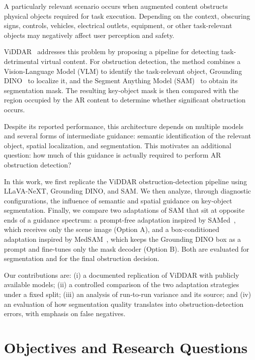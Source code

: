 \documentclass[conference]{IEEEtran}
\begin{document}
A particularly relevant scenario occurs when augmented content obstructs physical objects required for task execution. Depending on the context, obscuring signs, controls, vehicles, electrical outlets, equipment, or other task-relevant objects may negatively affect user perception and safety.

ViDDAR~\cite{viddar} addresses this problem by proposing a pipeline for detecting task-detrimental virtual content. For obstruction detection, the method combines a Vision-Language Model (VLM) to identify the task-relevant object, Grounding DINO~\cite{groundingdino} to localize it, and the Segment Anything Model (SAM)~\cite{sam} to obtain its segmentation mask. The resulting key-object mask is then compared with the region occupied by the AR content to determine whether significant obstruction occurs.

Despite its reported performance, this architecture depends on multiple models and several forms of intermediate guidance: semantic identification of the relevant object, spatial localization, and segmentation. This motivates an additional question: how much of this guidance is actually required to perform AR obstruction detection?

In this work, we first replicate the ViDDAR obstruction-detection pipeline using LLaVA-NeXT, Grounding DINO, and SAM. We then analyze, through diagnostic configurations, the influence of semantic and spatial guidance on key-object segmentation. Finally, we compare two adaptations of SAM that sit at opposite ends of a guidance spectrum: a prompt-free adaptation inspired by SAMed~\cite{samed}, which receives only the scene image (Option A), and a box-conditioned adaptation inspired by MedSAM~\cite{medsam}, which keeps the Grounding DINO box as a prompt and fine-tunes only the mask decoder (Option B). Both are evaluated for segmentation and for the final obstruction decision.

Our contributions are: (i) a documented replication of ViDDAR with publicly available models; (ii) a controlled comparison of the two adaptation strategies under a fixed split; (iii) an analysis of run-to-run variance and its source; and (iv) an evaluation of how segmentation quality translates into obstruction-detection errors, with emphasis on false negatives.


\section{Objectives and Research Questions}
\end{document}
